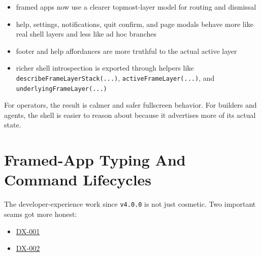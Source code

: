 \begin{itemize}
\tightlist
\item
  framed apps now use a clearer topmost-layer model for routing and dismissal
\item
  help, settings, notifications, quit confirm, and page modals behave more like real shell layers and less like ad hoc branches
\item
  footer and help affordances are more truthful to the actual active layer
\item
  richer shell introspection is exported through helpers like \texttt{d\allowbreak{}e\allowbreak{}s\allowbreak{}c\allowbreak{}r\allowbreak{}i\allowbreak{}b\allowbreak{}e\allowbreak{}F\allowbreak{}r\allowbreak{}a\allowbreak{}m\allowbreak{}e\allowbreak{}L\allowbreak{}a\allowbreak{}y\allowbreak{}e\allowbreak{}r\allowbreak{}S\allowbreak{}t\allowbreak{}a\allowbreak{}c\allowbreak{}k\allowbreak{}(\allowbreak{}.\allowbreak{}.\allowbreak{}.\allowbreak{})}, \texttt{a\allowbreak{}c\allowbreak{}t\allowbreak{}i\allowbreak{}v\allowbreak{}e\allowbreak{}F\allowbreak{}r\allowbreak{}a\allowbreak{}m\allowbreak{}e\allowbreak{}L\allowbreak{}a\allowbreak{}y\allowbreak{}e\allowbreak{}r\allowbreak{}(\allowbreak{}.\allowbreak{}.\allowbreak{}.\allowbreak{})}, and \texttt{u\allowbreak{}n\allowbreak{}d\allowbreak{}e\allowbreak{}r\allowbreak{}l\allowbreak{}y\allowbreak{}i\allowbreak{}n\allowbreak{}g\allowbreak{}F\allowbreak{}r\allowbreak{}a\allowbreak{}m\allowbreak{}e\allowbreak{}L\allowbreak{}a\allowbreak{}y\allowbreak{}e\allowbreak{}r\allowbreak{}(\allowbreak{}.\allowbreak{}.\allowbreak{}.\allowbreak{})}
\end{itemize}

For operators, the result is calmer and safer fullscreen behavior. For builders and agents, the shell is easier to reason about because it advertises more of its actual state.

\section{Framed-App Typing And Command Lifecycles}\label{record-275-framed-app-typing-and-command-lifecycles}

The developer-experience work since \texttt{v\allowbreak{}4\allowbreak{}.\allowbreak{}0\allowbreak{}.\allowbreak{}0} is not just cosmetic. Two important seams got more honest:

\begin{itemize}
\tightlist
\item
  \href{https://github.com/flyingrobots/bijou/blob/cbd70612140e7a450d764b3c7be1c6af878b99bc/docs/design/DX-001-type-framed-app-messages-and-updates-end-to-end.md}{DX-001}
\item
  \href{https://github.com/flyingrobots/bijou/blob/cbd70612140e7a450d764b3c7be1c6af878b99bc/docs/design/DX-002-reconcile-cmd-typing-with-cleanup-and-effect-patterns.md}{DX-002}
\end{itemize}

